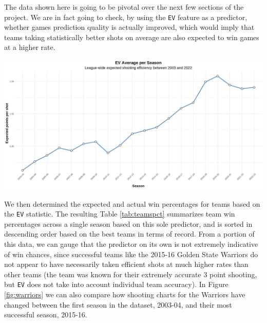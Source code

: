 \documentclass[
  12pt,
  a4paper,
]{article}
\let\origfigure\figure
\let\endorigfigure\endfigure
\renewenvironment{figure}[1][2] {
    \expandafter\origfigure\expandafter[H]
} {
    \endorigfigure
}
\begin{document}
The data shown here is going to be pivotal over the next few sections of the project. We are in fact going to check, by using the \texttt{EV} feature as a predictor, whether games prediction quality is actually improved, which would imply that teams taking statistically better shots on average are also expected to win games at a higher rate.

\begin{figure}

{\centering \includegraphics[width=1\linewidth]{latex/plotspng/plot_2} 

}

\caption{League-wide expected shooting efficiency between 2003 and 2022}\label{fig:evprog}
\end{figure}

We then determined the expected and actual win percentages for teams based on the \texttt{EV} statistic. The resulting Table \ref{tab:teamspct} summarizes team win percentages across a single season based on this sole predictor, and is sorted in descending order based on the best teams in terms of record. From a portion of this data, we can gauge that the predictor on its own is not extremely indicative of win chances, since successful teams like the 2015-16 Golden State Warriors do not appear to have necessarily taken efficient shots at much higher rates than other teams (the team was known for their extremely accurate 3 point shooting, but \texttt{EV} does not take into account individual team accuracy). In Figure \ref{fig:warriors} we can also compare how shooting charts for the Warriors have changed between the first season in the dataset, 2003-04, and their most successful season, 2015-16.
\end{document}
